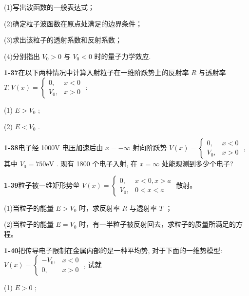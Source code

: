 (1)写出波函数的一般表达式；

(2)确定粒子波函数在原点处满足的边界条件；

(3)求出该粒子的透射系数和反射系数；

(4)分别指出 $\displaystyle V_{0} > 0$ 与 $\displaystyle V_{0} <   0$ 时的量子力学效应.

\vfill

\newpage

\textbf{1-37}\quad 在以下两种情况中计算入射粒子在一维阶跃势上的反射率 $\displaystyle R$ 与透射率 $\displaystyle T, V(x) = \begin{cases} 0, & x < 0 \\ V_0, & x > 0 \end{cases}$ :

(1) $\displaystyle E > V_0$ ;

(2) $\displaystyle E < V_0$ .

\vfill

\newpage

\textbf{1-38}\quad 电子经 1000V 电压加速后由 $\displaystyle x = -\infty$ 射向阶跃势 $\displaystyle V(x) = \begin{cases} 0, & x < 0 \\ V_0, & x > 0 \end{cases}$ , 其中 $\displaystyle V_0 = 750\mathrm{eV}$ . 现有 1800 个电子入射, 在 $\displaystyle x = \infty$ 处能观测到多少个电子?

\vfill

\newpage

\textbf{1-39}\quad 粒子被一维矩形势垒 $\displaystyle V(x) = \begin{cases} 0, & x < 0, x > a \\ V_0, & 0 < x < a \end{cases}$ 散射。

(1)当粒子的能量 $\displaystyle E > V_0$ 时，求反射率 $\displaystyle R$ 与透射率 $\displaystyle T$ ；

(2)当粒子的能量 $\displaystyle E = V_0$ 时，有一半粒子被反射回去，求粒子的质量所满足的方程。

\vfill

\newpage

\textbf{1-40}\quad 把传导电子限制在金属内部的是一种平均势, 对于下面的一维势模型: $\displaystyle V(x) = \begin{cases} -V_0, & x < 0 \\ 0, & x > 0 \end{cases}$ , 试就

(1) $\displaystyle E > 0$ ;

